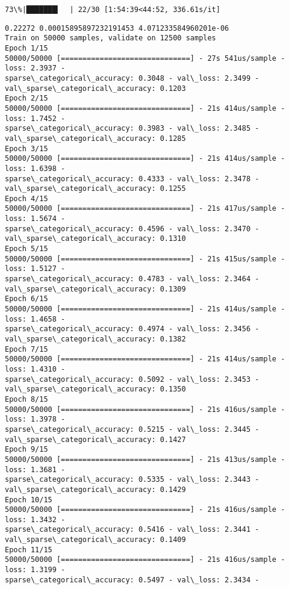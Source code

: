 \documentclass[11pt]{article}
\begin{document}
    \begin{Verbatim}[commandchars=\\\{\}]
 73\%|███████▎  | 22/30 [1:54:39<44:52, 336.61s/it]
    \end{Verbatim}

    \begin{Verbatim}[commandchars=\\\{\}]
0.22272 0.00015895897232191453 4.071233584960201e-06
Train on 50000 samples, validate on 12500 samples
Epoch 1/15
50000/50000 [==============================] - 27s 541us/sample - loss: 2.3937 -
sparse\_categorical\_accuracy: 0.3048 - val\_loss: 2.3499 -
val\_sparse\_categorical\_accuracy: 0.1203
Epoch 2/15
50000/50000 [==============================] - 21s 414us/sample - loss: 1.7452 -
sparse\_categorical\_accuracy: 0.3983 - val\_loss: 2.3485 -
val\_sparse\_categorical\_accuracy: 0.1285
Epoch 3/15
50000/50000 [==============================] - 21s 414us/sample - loss: 1.6398 -
sparse\_categorical\_accuracy: 0.4333 - val\_loss: 2.3478 -
val\_sparse\_categorical\_accuracy: 0.1255
Epoch 4/15
50000/50000 [==============================] - 21s 417us/sample - loss: 1.5674 -
sparse\_categorical\_accuracy: 0.4596 - val\_loss: 2.3470 -
val\_sparse\_categorical\_accuracy: 0.1310
Epoch 5/15
50000/50000 [==============================] - 21s 415us/sample - loss: 1.5127 -
sparse\_categorical\_accuracy: 0.4783 - val\_loss: 2.3464 -
val\_sparse\_categorical\_accuracy: 0.1309
Epoch 6/15
50000/50000 [==============================] - 21s 414us/sample - loss: 1.4658 -
sparse\_categorical\_accuracy: 0.4974 - val\_loss: 2.3456 -
val\_sparse\_categorical\_accuracy: 0.1382
Epoch 7/15
50000/50000 [==============================] - 21s 414us/sample - loss: 1.4310 -
sparse\_categorical\_accuracy: 0.5092 - val\_loss: 2.3453 -
val\_sparse\_categorical\_accuracy: 0.1350
Epoch 8/15
50000/50000 [==============================] - 21s 416us/sample - loss: 1.3978 -
sparse\_categorical\_accuracy: 0.5215 - val\_loss: 2.3445 -
val\_sparse\_categorical\_accuracy: 0.1427
Epoch 9/15
50000/50000 [==============================] - 21s 413us/sample - loss: 1.3681 -
sparse\_categorical\_accuracy: 0.5335 - val\_loss: 2.3443 -
val\_sparse\_categorical\_accuracy: 0.1429
Epoch 10/15
50000/50000 [==============================] - 21s 416us/sample - loss: 1.3432 -
sparse\_categorical\_accuracy: 0.5416 - val\_loss: 2.3441 -
val\_sparse\_categorical\_accuracy: 0.1409
Epoch 11/15
50000/50000 [==============================] - 21s 416us/sample - loss: 1.3199 -
sparse\_categorical\_accuracy: 0.5497 - val\_loss: 2.3434 -

\end{Verbatim}
\end{document}
